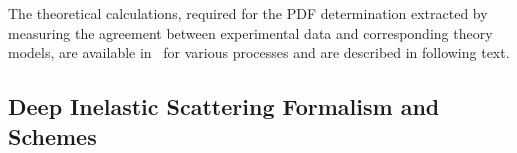 
\def\kt{\ensuremath{k_t}}
\newcommand{\Pmax}{p}
\newcommand{\CCFM}{CCFMa,CCFMb,Catani:1989sg,CCFMd}


%
The theoretical calculations, required for the PDF determination extracted by measuring 
the agreement between experimental data and corresponding theory models, are
available in \fitter\  for various processes and are described in following text.



\subsection{Deep Inelastic Scattering Formalism and Schemes}

